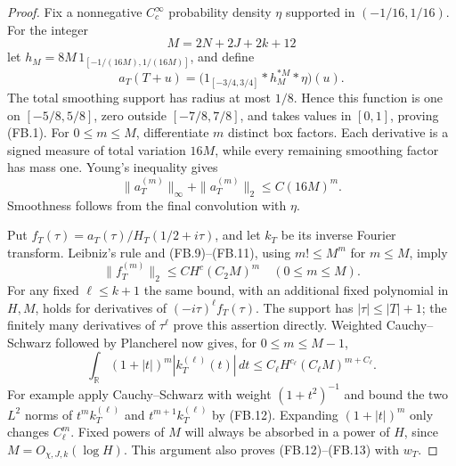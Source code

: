 \begin{proof}
Fix a nonnegative $C_c^\infty$ probability density $\eta$
supported in $(-1/16,1/16)$.
For the integer
\[
                         M=2N+2J+2k+12
\]
let $h_M=8M\,1_{[-1/(16M),1/(16M)]}$, and define
\[
 a_T(T+u)=
       \bigl(1_{[-3/4,3/4]}*h_M^{*M}*\eta\bigr)(u).
                                                               \tag{FB.10}
\]
The total smoothing support has radius at most $1/8$.
Hence this function is one on $[-5/8,5/8]$, zero outside
$[-7/8,7/8]$, and takes values in $[0,1]$, proving (FB.1).
For $0\leq m\leq M$, differentiate $m$ distinct box
factors.  Each derivative is a signed measure of total
variation $16M$, while every remaining smoothing factor
has mass one.  Young's inequality gives
\[
       \|a_T^{(m)}\|_\infty+\|a_T^{(m)}\|_2
                             \leq C(16M)^m.                  \tag{FB.11}
\]
Smoothness follows from the final convolution with $\eta$.

Put $f_T(\tau)=a_T(\tau)/H_T(1/2+i\tau)$, and let
$k_T$ be its inverse Fourier transform.
Leibniz's rule and (FB.9)--(FB.11), using
$m!\leq M^m$ for $m\leq M$, imply
\[
             \|f_T^{(m)}\|_2\leq C H^c(C_2M)^m
                          \quad(0\leq m\leq M).              \tag{FB.12}
\]
For any fixed $\ell\leq k+1$ the same bound, with an
additional fixed polynomial in $H,M$, holds for
derivatives of $( -i\tau)^\ell f_T(\tau)$.
The support has $|\tau|\leq|T|+1$; the finitely many
derivatives of $\tau^\ell$ prove this assertion directly.
Weighted Cauchy--Schwarz followed by Plancherel now gives,
for $0\leq m\leq M-1$,
\[
 \int_{\mathbb R}(1+|t|)^m|k_T^{(\ell)}(t)|\,dt
                  \leq C_\ell H^{c_\ell}
                                     (C_\ell M)^{m+C_\ell}.
                                                               \tag{FB.13}
\]
For example apply Cauchy--Schwarz with weight
$(1+t^2)^{-1}$ and bound the two $L^2$ norms of
$t^m k_T^{(\ell)}$ and $t^{m+1}k_T^{(\ell)}$ by
(FB.12).  Expanding $(1+|t|)^m$ only changes
$C_\ell^m$.  Fixed powers of $M$ will always be absorbed
in a power of $H$, since $M=O_{\chi,J,k}(\log H)$.
This argument also proves (FB.12)--(FB.13) with $w_T$.


\end{proof}
